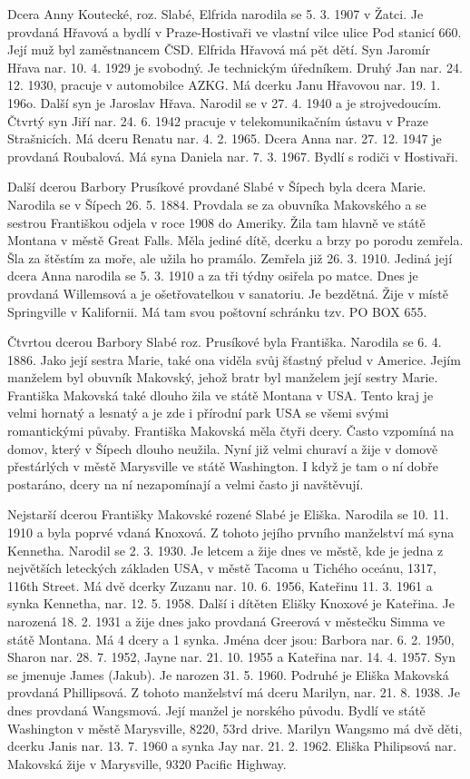 \documentclass[../dejiny-rodu-prusiku.tex]{subfiles}
\begin{document}
Dcera Anny Koutecké, roz. Slabé, Elfrida narodila se 5. 3. 1907 v Žatci. Je provdaná Hřavová a bydlí v Praze-Hostivaři ve vlastní vilce ulice Pod stanicí 660. Její muž byl zaměstnancem ČSD. Elfrida Hřavová má pět dětí. Syn Jaromír Hřava nar. 10. 4. 1929 je svobodný. Je technickým úředníkem. Druhý Jan nar. 24. 12. 1930, pracuje v automobilce AZKG. Má dcerku Janu Hřavovou nar. 19. 1. 196o. Další syn je Jaroslav Hřava. Narodil se v 27. 4. 1940 a je strojvedoucím. Čtvrtý syn Jiří nar. 24. 6. 1942 pracuje v telekomunikačním ústavu v Praze Strašnicích. Má dceru Renatu nar. 4. 2. 1965. Dcera Anna nar. 27. 12. 1947 je provdaná Roubalová. Má syna Daniela nar. 7. 3. 1967. Bydlí s rodiči v Hostivaři.

Další dcerou Barbory Prusíkové provdané Slabé v Šípech byla dcera Marie. Narodila se v Šípech 26. 5. 1884. Provdala se za obuvníka Makovského a se sestrou Františkou odjela v roce 1908 do Ameriky. Žila tam hlavně ve státě Montana v městě Great Falls. Měla jediné dítě, dcerku a brzy po porodu zemřela. Šla za štěstím za moře, ale užila ho pramálo. Zemřela již 26. 3. 1910. Jediná je­jí dcera Anna narodila se 5. 3. 1910 a za tři týdny osi­řela po matce. Dnes je provdaná Willemsová a je ošetřo­vatelkou v sanatoriu. Je bezdětná. Žije v místě Springville v Kalifornii. Má tam svou poštovní schránku tzv. PO BOX 655.

Čtvrtou dcerou Barbory Slabé roz. Prusíkové byla Fran­tiška. Narodila se 6. 4. 1886. Jako její sestra Marie, také ona viděla svůj šťastný přelud v Americe. Jejím manželem byl obuvník Makovský, jehož bratr byl manže­lem její sestry Marie. Františka Makovská také dlouho žila ve státě Montana v USA. Tento kraj je velmi horna­tý a lesnatý a je zde i přírodní park USA se všemi svými romantickými půvaby. Františka Makovská měla čtyři dcery. Často vzpomíná na domov, který v Šípech dlouho neužila. Nyní již velmi churaví a žije v domově přestárlých v městě Marysville ve státě Washington. I když je tam o ní dobře postaráno, dcery na ní nezapomínají a velmi často ji navštěvují.

Nejstarší dcerou Františky Makovské rozené Slabé je Eliška. Narodila se 10. 11. 1910 a byla poprvé vdaná Knoxová. Z tohoto jejího prvního manželství má syna Kennetha. Narodil se 2. 3. 1930. Je letcem a žije dnes ve městě, kde je jedna z největších leteckých základen USA, v městě Tacoma u Tichého oceánu, 1317, 116th Street. Má dvě dcerky Zu­zanu nar. 10. 6. 1956, Kateřinu 11. 3. 1961 a synka Kennetha, nar. 12. 5. 1958. Další i dítěten Elišky Knoxové je Kateřina. Je narozená 18. 2. 1931 a žije dnes jako provdaná Greerová v městečku Simma ve státě Montana. Má 4 dcery a 1 synka. Jména dcer jsou: Barbora nar. 6. 2. 1950, Sharon nar. 28. 7. 1952, Jayne nar. 21. 10. 1955 a Kateřina nar. 14. 4. 1957. Syn se jmenuje James (Jakub). Je narozen 31. 5. 1960. Podruhé je Eliška Makovská provdaná Phillipsová. Z tohoto manželství má dceru Marilyn, nar. 21. 8. 1938. Je dnes provdaná Wangsmová. Její manžel je norského původu. Bydlí ve státě Washington v městě Marysville, 8220, 53rd drive. Marilyn Wangsmo má dvě děti, dcerku Janis nar. 13. 7. 1960 a synka Jay nar. 21. 2. 1962. Eliška Philipsová nar. Makovská žije v Marysville, 9320 Pacific Highway.
\end{document}

